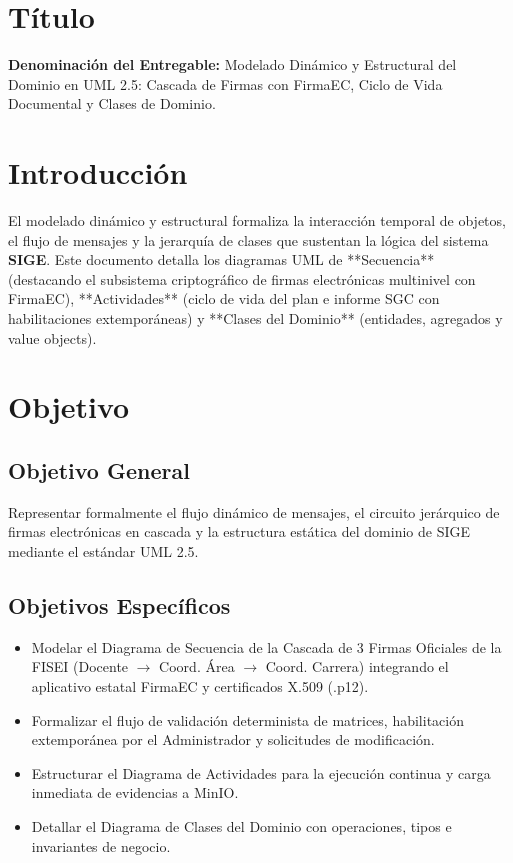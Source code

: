 \documentclass[12pt,a4paper]{article}
\begin{document}
\section{Título}
\textbf{Denominación del Entregable:} Modelado Dinámico y Estructural del Dominio en UML 2.5: Cascada de Firmas con FirmaEC, Ciclo de Vida Documental y Clases de Dominio.



\section{Introducción}
El modelado dinámico y estructural formaliza la interacción temporal de objetos, el flujo de mensajes y la jerarquía de clases que sustentan la lógica del sistema \textbf{SIGE}. Este documento detalla los diagramas UML de **Secuencia** (destacando el subsistema criptográfico de firmas electrónicas multinivel con FirmaEC), **Actividades** (ciclo de vida del plan e informe SGC con habilitaciones extemporáneas) y **Clases del Dominio** (entidades, agregados y value objects).

\section{Objetivo}

\subsection{Objetivo General}
Representar formalmente el flujo dinámico de mensajes, el circuito jerárquico de firmas electrónicas en cascada y la estructura estática del dominio de SIGE mediante el estándar UML 2.5.

\subsection{Objetivos Específicos}
\begin{itemize}[leftmargin=1.5em, itemsep=1.5pt, topsep=1.5pt]
    \item Modelar el Diagrama de Secuencia de la Cascada de 3 Firmas Oficiales de la FISEI (Docente $\rightarrow$ Coord. Área $\rightarrow$ Coord. Carrera) integrando el aplicativo estatal FirmaEC y certificados X.509 (.p12).
    \item Formalizar el flujo de validación determinista de matrices, habilitación extemporánea por el Administrador y solicitudes de modificación.
    \item Estructurar el Diagrama de Actividades para la ejecución continua y carga inmediata de evidencias a MinIO.
    \item Detallar el Diagrama de Clases del Dominio con operaciones, tipos e invariantes de negocio.
\end{itemize}
\end{document}

